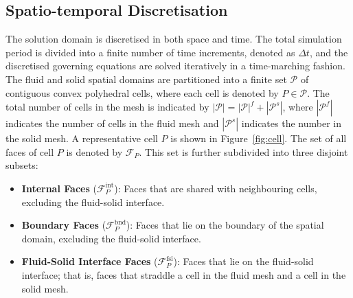 \documentclass[sn-mathphys,Numbered]{sn-jnl}%
\begin{document}
\subsection{Spatio-temporal Discretisation}
\label{sec:space_time_discretisation}
The solution domain is discretised in both space and time.
The total simulation period is divided into a finite number of time increments, denoted as $\Delta t$, and the discretised governing equations are solved iteratively in a time-marching fashion.
The fluid and solid spatial domains are partitioned into a finite set $\mathcal{P}$ of contiguous convex polyhedral cells, where each cell is denoted by $P \in \mathcal{P}$.
The total number of cells in the mesh is indicated by $|\mathcal{P}| = |\mathcal{P}|^f + |\mathcal{P}^s|$, where $|\mathcal{P}^f|$ indicates the number of cells in the fluid mesh and $|\mathcal{P}^s|$ indicates the number in the solid mesh.
A representative cell $P$ is shown in Figure~\ref{fig:cell}.
The set of all faces of cell $P$ is denoted by $\mathcal{F}_P$. This set is further subdivided into three disjoint subsets:
\begin{itemize}
    \item \textbf{Internal Faces} ($\mathcal{F}^{\text{int}}_P$): Faces that are shared with neighbouring cells, excluding the fluid-solid interface. 
    \item \textbf{Boundary Faces} ($\mathcal{F}^{\text{bnd}}_P$): Faces that lie on the boundary of the spatial domain, excluding the fluid-solid interface.
    \item \textbf{Fluid-Solid Interface Faces} ($\mathcal{F}^{\text{fsi}}_P$): Faces that lie on the fluid-solid interface; that is, faces that straddle a cell in the fluid mesh and a cell in the solid mesh.
\end{itemize}
\end{document}
